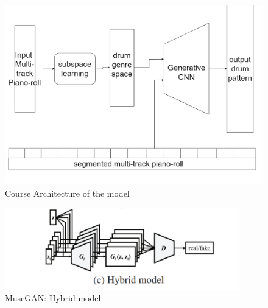 \begin{par}
    \begin{figure}[H]
        \centering
        \includegraphics[width=6in]{image/proposal_architecture}
        \caption{Course Architecture of the model}
        \label{fig:archie}
    \end{figure}

    \begin{figure}[H]
        \centering
        \includegraphics[width=4in]{image/hybrid_model}
        \caption{MuseGAN: Hybrid model}
        \label{fig:hybrid}
    \end{figure}

\end{par}